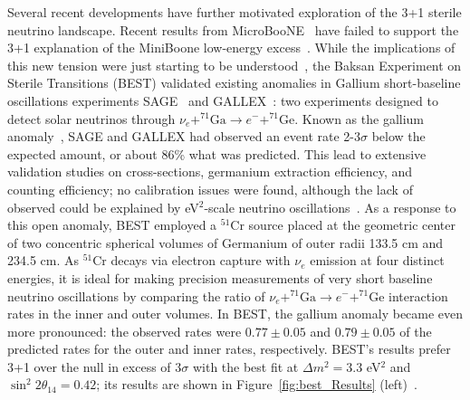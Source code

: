 \documentclass[main.tex]{subfiles}
\begin{document}
Several recent developments have further motivated exploration of the 3+1 sterile neutrino landscape. 
Recent results from MicroBooNE~\cite{microboonecollaboration2021search,microboonecollaboration2021searchmulti} have failed to support the 3+1 explanation of the MiniBoone low-energy excess~\cite{aguilar2018significant}. 
While the implications of this new tension were just starting to be understood~\cite{arguelles2021microboone,denton2021sterile}, the Baksan Experiment on Sterile Transitions (BEST) validated existing anomalies in Gallium short-baseline oscillations experiments SAGE~\cite{PhysRevC.73.045805} and GALLEX~\cite{KAETHER201047}: two experiments designed to detect solar neutrinos through $\nu_{e}+^{71}\text{Ga}\to e^{-} +^{71}\text{Ge}$. 
Known as the gallium anomaly~\cite{LAVEDER2007344}, SAGE and GALLEX had observed an event rate 2-3$\sigma$ below the expected amount, or about 86\% what was predicted.
This lead to extensive validation studies on cross-sections, germanium extraction efficiency, and counting efficiency; no calibration issues were found, although the lack of observed could be explained by eV$^{2}$-scale neutrino oscillations~\cite{LAVEDER2007344}.
As a response to this open anomaly, BEST employed a $^{51}$Cr source placed at the geometric center of two concentric spherical volumes of Germanium of outer radii 133.5 cm and 234.5 cm.
As $^{51}$Cr decays via electron capture with $\nu_{e}$ emission at four distinct energies, it is ideal for making precision measurements of very short baseline neutrino oscillations by comparing the ratio of $\nu_{e}+^{71}\text{Ga}\to e^{-} +^{71}\text{Ge}$ interaction rates in the inner and outer volumes.
In BEST, the gallium anomaly became even more pronounced: the observed rates were $0.77\pm0.05$ and $0.79\pm0.05$ of the predicted rates for the outer and inner rates, respectively. 
BEST's results prefer 3+1 over the null in excess of $3 \sigma$ with the best fit at $\Delta m^{2}=3.3$ eV$^{2}$ and $\sin^{2}2\theta_{14}=0.42$; its results are shown in Figure~\ref{fig:best_Results} (left)~\cite{barinov2021results, Barinov_2022}.
\end{document}
